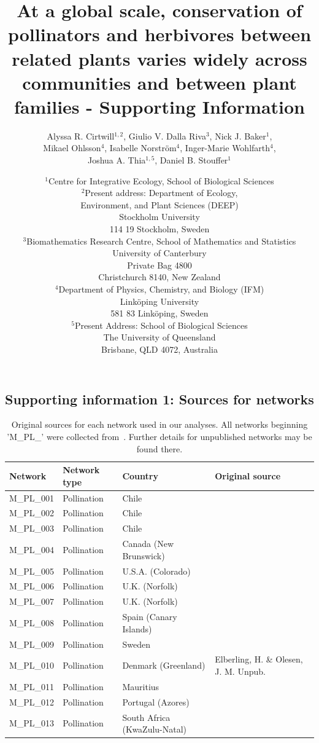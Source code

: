 \documentclass[12pt]{article}
\title{At a global scale, conservation of pollinators and herbivores between related plants varies widely across communities and between plant families - Supporting Information}
\author{Alyssa R. Cirtwill$^{1,2}$, Giulio V. Dalla Riva$^{3}$, Nick J. Baker$^{1}$,\\
Mikael Ohlsson$^{4}$, Isabelle Norstr\"{o}m$^{4}$, Inger-Marie Wohlfarth$^{4}$,\\
Joshua A. Thia$^{1,5}$, 
Daniel B. Stouffer$^{1}$}
\date{\small$^1$Centre for Integrative Ecology, School of Biological Sciences\\
\medskip$^2$Present address: Department of Ecology,\\
Environment, and Plant Sciences (DEEP)\\
Stockholm University\\
114 19 Stockholm, Sweden\\
\medskip$^3$Biomathematics Research Centre, School of Mathematics and Statistics\\
University of Canterbury\\Private Bag 4800\\
Christchurch 8140, New Zealand\\
\medskip$^4$Department of Physics, Chemistry, and Biology (IFM)\\ Link\"{o}ping University\\ 581 83 Link\"{o}ping, Sweden\\
\medskip$^5$Present Address: School of Biological Sciences\\
The University of Queensland\\Brisbane, QLD 4072, Australia }
\newcommand{\beginsupplement}{%
        \setcounter{table}{0}
        \renewcommand{\thetable}{S\arabic{table}}%
        \setcounter{figure}{0}
        \renewcommand{\thefigure}{S\arabic{figure}}%
     }
\begin{document}
\maketitle
\baselineskip=8.5mm
\begin{spacing}{1.5}

\linenumbers
\beginsupplement
\clearpage

\section*{Supporting information 1: Sources for networks}
  \begin{table}[!h]
    \caption{Original sources for each network used in our analyses. All networks beginning 'M\_PL\_' were collected from~\citet{weboflife}. Further details for unpublished networks may be found there.}
    \label{sources}
    \begin{center}
    \begin{tabular}{|l l l m{8cm} |}
    \hline
    Network & Network type & Country & Original source  \\
    \hline
    M\_PL\_001  & Pollination & Chile & \citep{Arroyo1982}  \\
    M\_PL\_002  & Pollination & Chile & \citep{Arroyo1982}  \\
    M\_PL\_003  & Pollination & Chile & \citep{Arroyo1982}  \\
    M\_PL\_004  & Pollination & Canada (New Brunswick) & \citep{Barrett1987} \\
    M\_PL\_005  & Pollination & U.S.A. (Colorado) & \citep{Clements1923}  \\
    M\_PL\_006  & Pollination & U.K. (Norfolk) & \citep{Dicks2002} \\
    M\_PL\_007  & Pollination & U.K. (Norfolk) & \citep{Dicks2002} \\
    M\_PL\_008  & Pollination & Spain (Canary Islands) & \citep{Dupont2003}  \\
    M\_PL\_009  & Pollination & Sweden & \citep{Elberling1999} \\
    M\_PL\_010  & Pollination & Denmark (Greenland) & Elberling, H. \& Olesen, J. M. Unpub. \\
    M\_PL\_011  & Pollination & Mauritius & \citep{Olesen2002a}  \\
    M\_PL\_012  & Pollination & Portugal (Azores) & \citep{Olesen2002a}  \\
    M\_PL\_013  & Pollination & South Africa (KwaZulu-Natal) & \citep{Ollerton2003}  \\

\end{tabular}
\end{center}
\end{table}
\end{spacing}
\end{document}
